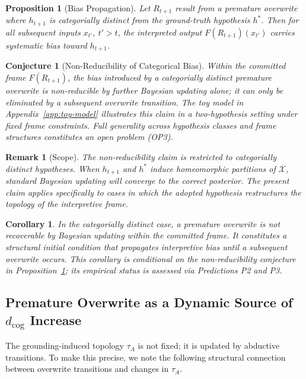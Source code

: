 \documentclass[12pt]{article}
\newtheorem{proposition}{Proposition}
\newtheorem{corollary}{Corollary}
\newtheorem{conjecture}{Conjecture}
\newtheorem{remark}{Remark}
\begin{document}
\begin{proposition}[Bias Propagation]
\label{prop:bias}
Let $R_{t+1}$ result from a premature overwrite where $h_{t+1}$ is
categorially distinct from the ground-truth hypothesis $h^*$.
Then for all subsequent inputs $x_{t'}$, $t' > t$, the interpreted
output $F(R_{t+1})(x_{t'})$ carries systematic bias toward $h_{t+1}$.
\end{proposition}

\begin{conjecture}[Non-Reducibility of Categorical Bias]
\label{conj:nonreducibility}
Within the committed frame $F(R_{t+1})$, the bias introduced by a
categorially distinct premature overwrite is non-reducible by further
Bayesian updating alone; it can only be eliminated by a subsequent
overwrite transition.
The toy model in Appendix~\ref{app:toy-model} illustrates this claim
in a two-hypothesis setting under fixed frame constraints.
Full generality across hypothesis classes and frame structures
constitutes an open problem (OP3).
\end{conjecture}

\begin{remark}[Scope]
The non-reducibility claim is restricted to categorially distinct
hypotheses. When $h_{t+1}$ and $h^*$ induce homeomorphic partitions
of $\mathcal{X}$, standard Bayesian updating will converge to the
correct posterior. The present claim applies specifically to cases in
which the adopted hypothesis restructures the topology of the
interpretive frame.
\end{remark}

\begin{corollary}
In the categorially distinct case, a premature overwrite is not
recoverable by Bayesian updating within the committed frame.
It constitutes a structural initial condition that propagates
interpretive bias until a subsequent overwrite occurs.
This corollary is conditional on the non-reducibility conjecture
in Proposition~\ref{prop:bias}; its empirical status is assessed
via Predictions P2 and P3.
\end{corollary}

\subsection{Premature Overwrite as a Dynamic Source of $d_\mathrm{cog}$ Increase}

The grounding-induced topology $\tau_A$ is not fixed; it is updated
by abductive transitions.
To make this precise, we note the following structural connection between
overwrite transitions and changes in $\tau_A$.
\end{document}
